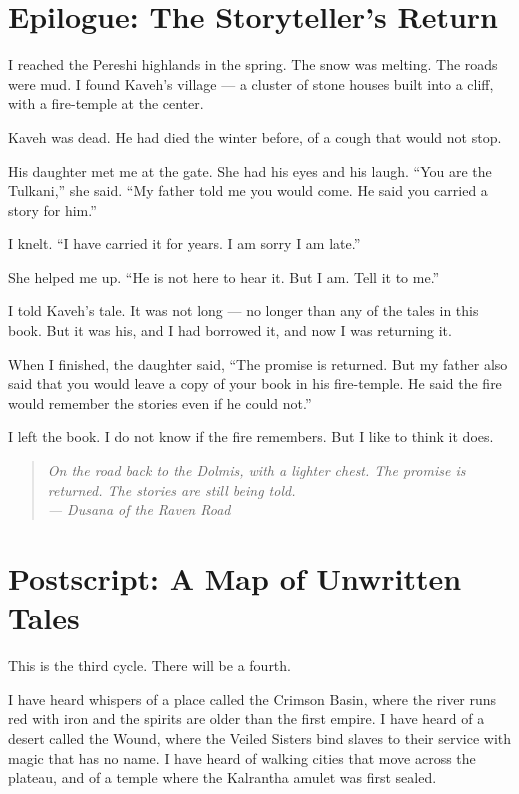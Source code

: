 \documentclass[10pt,twoside]{book}
\newcommand{\dusana}[1]{\begin{quote}\itshape #1 \\ --- Dusana of the Raven Road\end{quote}}
\begin{document}
\chapter*{Epilogue: The Storyteller's Return}

I reached the Pereshi highlands in the spring. The snow was melting. The roads were mud. I found Kaveh's village --- a cluster of stone houses built into a cliff, with a fire-temple at the center.

Kaveh was dead. He had died the winter before, of a cough that would not stop.

His daughter met me at the gate. She had his eyes and his laugh. ``You are the Tulkani,'' she said. ``My father told me you would come. He said you carried a story for him.''

I knelt. ``I have carried it for years. I am sorry I am late.''

She helped me up. ``He is not here to hear it. But I am. Tell it to me.''

I told Kaveh's tale. It was not long --- no longer than any of the tales in this book. But it was his, and I had borrowed it, and now I was returning it.

When I finished, the daughter said, ``The promise is returned. But my father also said that you would leave a copy of your book in his fire-temple. He said the fire would remember the stories even if he could not.''

I left the book. I do not know if the fire remembers. But I like to think it does.

\dusana{On the road back to the Dolmis, with a lighter chest. The promise is returned. The stories are still being told.}

\chapter*{Postscript: A Map of Unwritten Tales}

This is the third cycle. There will be a fourth.

I have heard whispers of a place called the Crimson Basin, where the river runs red with iron and the spirits are older than the first empire. I have heard of a desert called the Wound, where the Veiled Sisters bind slaves to their service with magic that has no name. I have heard of walking cities that move across the plateau, and of a temple where the Kalrantha amulet was first sealed.
\end{document}
